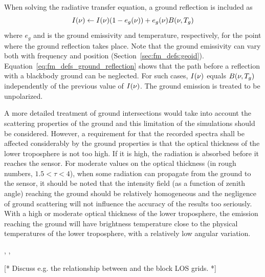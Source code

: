 When solving the radiative transfer equation, a ground reflection is
included as
\begin{equation}
  I(\nu) \gets I(\nu)(1-e_g(\nu)) + e_g(\nu)B(\nu,T_{g})
  \label{eq:fm_defs_ground_reflection}
\end{equation}
where $e_g$ and  is the ground emissivity and temperature,
respectively, for the point where the ground reflection takes place.
Note that the ground emissivity can vary both with frequency and
position (Section~\ref{sec:fm_defs:geoid}).
Equation~\ref{eq:fm_defs_ground_reflection} shows that the path before
a reflection with a blackbody ground can be neglected. For such cases,
$I(\nu)$ equals $B(\nu,T_{g})$ independently of the previous
value of $I(\nu)$. The ground emission is treated to be
unpolarized.

A more detailed treatment of ground intersections would take into
account the scattering properties of the ground and this limitation of
the simulations should be considered. However, a requirement for that
the recorded spectra shall be affected considerably by the ground
properties is that the optical thickness of the lower troposphere is
not too high. If it is high, the radiation is absorbed before it
reaches the sensor. For moderate values on the optical thickness (in
rough numbers, $1.5<\tau<4$), when some radiation can propagate
from the ground to the sensor, it should be noted that the intensity
field (as a function of zenith angle) reaching the ground should be
relatively homogeneous and the negligence of ground scattering will not
influence the accuracy of the results too seriously. With a high or
moderate optical thickness of the lower troposphere, the emission
reaching the ground will have brightness temperature close to the
physical temperatures of the lower troposphere, with a relatively low
angular variation.



\label{sec:fm_defs:sensor2}

, , 


\label{sec:fm_defs:howtomeasseq}

[* Discuss e.g. the relationship between  and the block LOS grids. *]


\label{sec:fm_defs:scattering}

